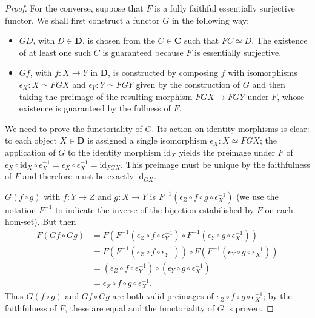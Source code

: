 \documentclass[a5paper,oneside,11pt]{article}
\newcommand\id{\mathord{\mathrm{id}}}
\newcommand\1{\mathord{\mathrm{1}}}
\newcommand\cat[1]{\mathbf{#1}}
\begin{document}
\begin{proof}
    For the converse, suppose that $F$ is a fully faithful essentially surjective functor.
    We shall first construct a functor $G$ in the following way:
    \begin{itemize}
        \item $GD$, with $D \in \cat{D}$, is chosen from the $C \in \cat{C}$ such that
            $FC \simeq D$.
            The existence of at least one such $C$ is guaranteed because $F$ is essentially
            surjective.
        \item $Gf$, with $f : X \rightarrow Y$ in $\cat{D}$, is constructed by composing $f$ with
            isomorphisms $\epsilon_X : X \simeq FGX$ and $\epsilon_Y : Y \simeq FGY$ given by the
            construction of $G$ and then taking the preimage of the resulting morphism
            $FGX \rightarrow FGY$ under $F$, whose existence is guaranteed by the fullness of $F$.
    \end{itemize}
    We need to prove the functoriality of $G$.
    Its action on identity morphisms is clear: to each object $X \in \cat{D}$ is assigned a single
    isomorphism $\epsilon_X : X \simeq FGX$; the application of $G$ to the identity morphism $\id_X$
    yields the preimage under $F$ of
    $\epsilon_X \circ \id_X \circ \epsilon_X^{-1} = \epsilon_X \circ \epsilon_X^{-1} = \id_{FGX}$.
    This preimage must be unique by the faithfulness of $F$ and therefore must be exactly $\id_{GX}$.

    $G(f \circ g)$ with $f : Y \rightarrow Z$ and
    $g : X \rightarrow Y$ is $F^{-1}(\epsilon_Z \circ f \circ g \circ \epsilon_X^{-1})$ (we use
    the notation $F^{-1}$ to indicate the inverse of the bijection estabilished by $F$ on each
    hom-set).
    But then
    \begin{equation*}
        \begin{split}
            F(Gf \circ Gg) &=
            F(F^{-1}(\epsilon_Z \circ f \circ \epsilon_Y^{-1}) \circ
            F^{-1}(\epsilon_Y \circ g \circ \epsilon_X^{-1})) \\
            &= F(F^{-1}(\epsilon_Z \circ f \circ \epsilon_Y^{-1})) \circ
            F(F^{-1}(\epsilon_Y \circ g \circ \epsilon_X^{-1})) \\
            &= (\epsilon_Z \circ f \circ \epsilon_Y^{-1}) \circ (\epsilon_Y \circ g \circ \epsilon_X^{-1}) \\
            &= \epsilon_Z \circ f \circ g \circ \epsilon_X^{-1}.
        \end{split}
    \end{equation*}
    Thus $G(f \circ g)$ and $Gf \circ Gg$ are both valid preimages of
    $\epsilon_Z \circ f \circ g \circ \epsilon_X^{-1}$; by the faithfulness of $F$, these are equal
    and the functoriality of $G$ is proven.


\end{proof}
\end{document}
